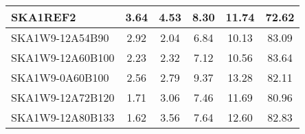 \begin{table}[H]
{{\begin{tabular}{|lccccc|}
SKA1REF2 & 3.64 \cellcolor{blue!60.00} & 4.53 \cellcolor{red!60.00} & 8.30 \cellcolor{green!42.24} & 11.74 \cellcolor{orange!39.47} & 72.62 \cellcolor{purple!18.00}\\ \hline 
SKA1W9-12A54B90 & 2.92 \cellcolor{blue!45.03} & 2.04 \cellcolor{red!18.00} & 6.84 \cellcolor{green!18.00} & 10.13 \cellcolor{orange!18.00} & 83.09 \cellcolor{purple!57.90}\\ \hline 
SKA1W9-12A60B100 & 2.23 \cellcolor{blue!30.68} & 2.32 \cellcolor{red!22.72} & 7.12 \cellcolor{green!22.65} & 10.56 \cellcolor{orange!23.73} & 83.64 \cellcolor{purple!60.00}\\ \hline 
SKA1W9-0A60B100 & 2.56 \cellcolor{blue!37.54} & 2.79 \cellcolor{red!30.65} & 9.37 \cellcolor{green!60.00} & 13.28 \cellcolor{orange!60.00} & 82.11 \cellcolor{purple!54.17}\\ \hline 
SKA1W9-12A72B120 & 1.71 \cellcolor{blue!19.87} & 3.06 \cellcolor{red!35.20} & 7.46 \cellcolor{green!28.29} & 11.69 \cellcolor{orange!38.80} & 80.96 \cellcolor{purple!49.79}\\ \hline 
SKA1W9-12A80B133 & 1.62 \cellcolor{blue!18.00} & 3.56 \cellcolor{red!43.64} & 7.64 \cellcolor{green!31.28} & 12.60 \cellcolor{orange!50.93} & 82.83 \cellcolor{purple!56.91}\\ \hline 
\end{tabular}}
\vspace{0.000000cm}
\hspace{1cm} 
}
\end{table}
